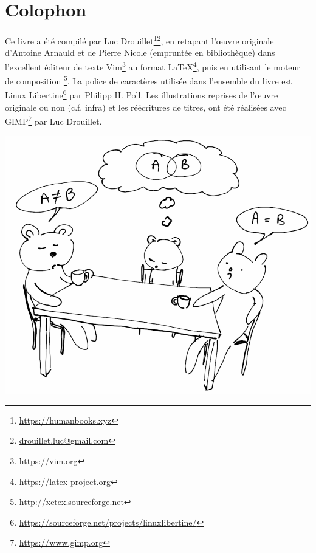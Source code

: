 \section*{\centering Colophon}
\par Ce livre a été compilé par Luc Drouillet\footnote{\href{https://humanbooks.xyz}{https://humanbooks.xyz}}\footnote{\href{mailto:drouillet.luc@gmail.com}{drouillet.luc@gmail.com}}, en retapant l'\oe uvre originale d'Antoine Arnauld et de Pierre Nicole (empruntée en bibliothèque) dans l'excellent éditeur de texte {Vim}\footnote{\href{https://vim.org}{https://vim.org}} au format \LaTeX\footnote{\href{https://latex-project.org}{https://latex-project.org}}, puis en utilisant le moteur de composition \XeTeX\footnote{\href{http://xetex.sourceforge.net}{http://xetex.sourceforge.net}}.
La police de caractères utilisée dans l'ensemble du livre est {Linux Libertine}\footnote{\href{https://sourceforge.net/projects/linuxlibertine/}{https://sourceforge.net/projects/linuxlibertine/}} par Philipp H. Poll. Les illustrations \textendash{} reprises de l'\oe uvre originale ou non (c.f. infra) \textendash{} et les réécritures de titres, ont été réalisées avec {GIMP}\footnote{\href{https://www.gimp.org}{https://www.gimp.org}} par Luc Drouillet.
\begin{center}
{\centering \includegraphics[scale=0.148]{images/_illustration_colophon_LD.png}}
\end{center}

